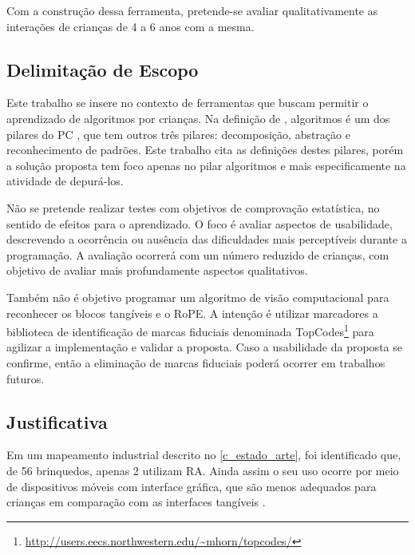 Com a construção dessa ferramenta, pretende-se avaliar qualitativamente as interações de crianças de 4 a 6 anos com a mesma. 

\subsection{Delimitação de Escopo}
\label{ss_cintro_escopo}

Este trabalho se insere no contexto de ferramentas que buscam permitir o aprendizado de algoritmos por crianças. Na definição de , algoritmos é um dos pilares do \acl{PC} \cite{brackmann_desenvolvimento_2017}, que tem outros três pilares: decomposição, abstração e reconhecimento de padrões. Este trabalho cita as definições destes pilares, porém a solução proposta tem foco apenas no pilar algoritmos e mais especificamente na atividade de depurá-los.

Não se pretende realizar testes com objetivos de comprovação estatística, no sentido de efeitos para o aprendizado. O foco é avaliar aspectos de usabilidade, descrevendo a ocorrência ou ausência das dificuldades mais perceptíveis durante a programação. A avaliação ocorrerá com um número reduzido de crianças, com objetivo de avaliar mais profundamente aspectos qualitativos.

Também não é objetivo programar um algoritmo de visão computacional para reconhecer os blocos tangíveis e o RoPE. A intenção é utilizar marcadores a biblioteca de identificação de marcas fiduciais denominada TopCodes\footnote{\url{http://users.eecs.northwestern.edu/~mhorn/topcodes/}} para agilizar a implementação e validar a proposta. Caso a usabilidade da proposta se confirme, então a eliminação de marcas fiduciais poderá ocorrer em trabalhos futuros.

\subsection{Justificativa}
\label{ss_cintro_justificativa}

Em um mapeamento industrial descrito no \autoref{c_estado_arte}, foi identificado que, de 56 brinquedos, apenas 2 utilizam RA. Ainda assim o seu uso ocorre por meio de dispositivos móveis com interface gráfica, que são menos adequados para crianças em comparação com as interfaces tangíveis \cite{sapounidis_tangible_2019, zuckerman_tui_2013}.

